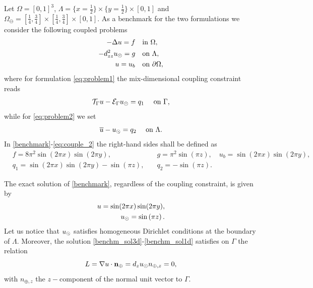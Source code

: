 \documentclass[r]{siamart171218}
\begin{document}
Let $\Omega=[0,1]^3$, $\Lambda=\{x=\tfrac{1}{2}\}\times \{y=\tfrac{1}{2}\} \times [0,1] $
and $\Omega_{\ominus}=[\tfrac{1}{4}, \tfrac{3}{4}]\times [\tfrac{1}{4}, \tfrac{3}{4}]\times [0, 1]$.
As a benchmark for the two formulations we consider the following coupled problems
%
\begin{subequations}\label{benchmark}
\begin{align}
\label{benchm_3d}
-\Delta u=f \quad &\text{in $\Omega$},\\
\label{benchm_1d}
-d_{zz}^2 \ud =g \quad &\text{on $\Lambda$},\\
u=u_b \quad &\text{on $\partial \Omega$},
\end{align}
\end{subequations}
where for formulation \eqref{eq:problem1} the mix-dimensional coupling constraint reads
\begin{equation}
  \label{eq:couple_1}
\trace{u} - \ext{\ud} = q_1\quad\text{ on }\Gamma,
\end{equation}
while for \eqref{eq:problem2} we set
\begin{equation}
    \label{eq:couple_2}
\avrc{u} - \ud = q_2\quad\text{ on }\Lambda.
\end{equation}
%
In \eqref{benchmark}-\eqref{eq:couple_2} the right-hand sides shall be defined as 
\begin{eqnarray*}
  &f=8\pi ^2 \sin (2\pi x) \sin (2\pi y),\quad &g={\pi ^2}\sin \left({\pi z}\right),\quad u_b=\sin (2\pi x) \sin (2\pi y),\\
  &q_1=\sin (2\pi x) \sin (2\pi y) - \sin \left({\pi z}\right),\quad &q_2=-\sin \left({\pi z}\right).
\end{eqnarray*}

The exact solution of \eqref{benchmark}, regardless of the coupling constraint,
is given by
%
\begin{eqnarray}
\label{benchm_sol3d}
u=\sin (2\pi x) \sin (2\pi y),\\
\label{benchm_sol1d}
\ud=\sin \left({\pi z}\right).
\end{eqnarray}
%
Let us notice that $u_{\odot}$ satisfies homogeneous Dirichlet conditions at the boundary of $\Lambda$.
Moreover, the solution \eqref{benchm_sol3d}-\eqref{benchm_sol1d} satisfies on $\Gamma$ the relation
\begin{equation}\label{benchm_flux}
L=\nabla u \cdot \textbf{n}_{\oplus}=d_z \ud n_{\oplus,z}=0,
\end{equation}
with $n_{\oplus,z}$ the $z-$component of the normal unit vector to $\Gamma$.
\end{document}
